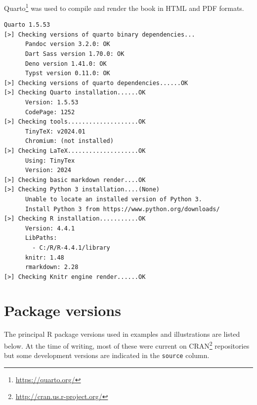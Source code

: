 \documentclass[
  letterpaper,
  10pt,
  krantz2]{krantz}
\providecommand{\href}[2]{#2\footnote{\url{#1}}}
\begin{document}
\href{https://quarto.org/}{Quarto} was used to compile and render the
book in HTML and PDF formats.

\begin{verbatim}
Quarto 1.5.53
[>] Checking versions of quarto binary dependencies...
      Pandoc version 3.2.0: OK
      Dart Sass version 1.70.0: OK
      Deno version 1.41.0: OK
      Typst version 0.11.0: OK
[>] Checking versions of quarto dependencies......OK
[>] Checking Quarto installation......OK
      Version: 1.5.53
      CodePage: 1252
[>] Checking tools....................OK
      TinyTeX: v2024.01
      Chromium: (not installed)
[>] Checking LaTeX....................OK
      Using: TinyTex
      Version: 2024
[>] Checking basic markdown render....OK
[>] Checking Python 3 installation....(None)
      Unable to locate an installed version of Python 3.
      Install Python 3 from https://www.python.org/downloads/
[>] Checking R installation...........OK
      Version: 4.4.1
      LibPaths:
        - C:/R/R-4.4.1/library
      knitr: 1.48
      rmarkdown: 2.28
[>] Checking Knitr engine render......OK
\end{verbatim}

\section*{Package versions}\label{package-versions}


The principal R package versions used in examples and illustrations are
listed below. At the time of writing, most of these were current on
\href{http://cran.us.r-project.org/}{CRAN} repositories but some
development versions are indicated in the \texttt{source} column.
\end{document}

